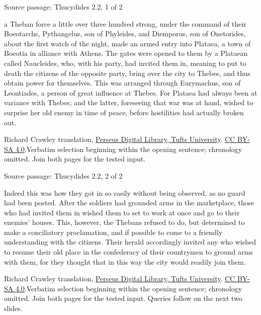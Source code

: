 \documentclass[aspectratio=169,10pt]{beamer}
\newcommand{\source}[1]{\vfill{\scriptsize\color{slate}#1\par}}
\newcommand{\thucsource}{Richard Crawley translation, \href{https://github.com/PerseusDL/canonical-greekLit/tree/master/data/tlg0003/tlg001}{Perseus Digital Library, Tufts University}. \href{https://creativecommons.org/licenses/by-sa/4.0/}{CC BY-SA 4.0}.}
\begin{document}
\begin{frame}{Source passage: Thucydides 2.2, 1 of 2}
\normalsize\raggedright\setlength{\parskip}{6pt}
a Theban force a little over three hundred strong, under the command of their Boeotarchs, Pythangelus, son of Phyleides, and Diemporus, son of Onetorides, about the first watch of the night, made an armed entry into Plataea, a town of Boeotia in alliance with Athens. The gates were opened to them by a Plataean called Naucleides, who, with his party, had invited them in, meaning to put to death the citizens of the opposite party, bring over the city to Thebes, and thus obtain power for themselves. This was arranged through Eurymachus, son of Leontiades, a person of great influence at Thebes. For Plataea had always been at variance with Thebes; and the latter, foreseeing that war was at hand, wished to surprise her old enemy in time of peace, before hostilities had actually broken out.
\source{\thucsource\newline Verbatim selection beginning within the opening sentence; chronology omitted. Join both pages for the tested input.}
\end{frame}

\begin{frame}{Source passage: Thucydides 2.2, 2 of 2}
\normalsize\raggedright\setlength{\parskip}{6pt}
Indeed this was how they got in so easily without being observed, as no guard had been posted. After the soldiers had grounded arms in the marketplace, those who had invited them in wished them to set to work at once and go to their enemies' houses. This, however, the Thebans refused to do, but determined to make a conciliatory proclamation, and if possible to come to a friendly understanding with the citizens. Their herald accordingly invited any who wished to resume their old place in the confederacy of their countrymen to ground arms with them, for they thought that in this way the city would readily join them.
\source{\thucsource\newline Verbatim selection beginning within the opening sentence; chronology omitted. Join both pages for the tested input. Queries follow on the next two slides.}
\end{frame}
\end{document}
